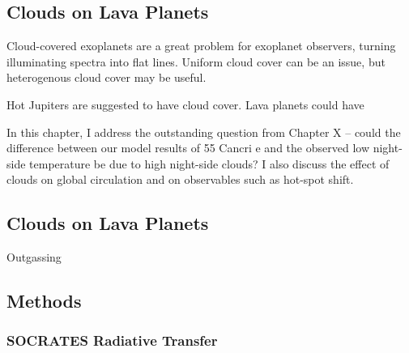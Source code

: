 \begin{SingleSpace}
\chapter{Clouds on Lava Planets}\label{ch:clouds-lava-planets}
\vspace{0.5cm}
\end{SingleSpace}
\vspace{0.5cm}






Cloud-covered exoplanets are a great problem for exoplanet observers, turning illuminating spectra into flat lines. Uniform cloud cover can be an issue, but heterogenous cloud cover may be useful.



Hot Jupiters are suggested to have cloud cover. Lava planets could have



In this chapter, I address the outstanding question from Chapter X -- could the difference between our model results of 55 Cancri e and the observed low night-side temperature be due to high night-side clouds? I also discuss the effect of clouds on global circulation and on observables such as hot-spot shift.


\section{Clouds on Lava Planets}

Outgassing







\section{Methods}


\subsection{SOCRATES Radiative Transfer}

